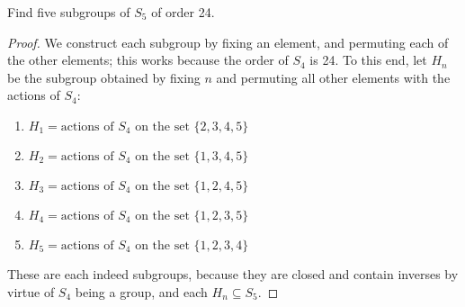 \documentclass{article}
\begin{document}
Find five subgroups of $S_5$ of order 24.

\begin{proof}
We construct each subgroup by fixing an element, and permuting each of the other elements; this works because the order of $S_4$ is 24. To this end, let $H_n$ be the subgroup obtained by fixing $n$ and permuting all other elements with the actions of $S_4$:
\begin{enumerate}
    \item $H_1 = \text{actions of $S_4$ on the set } \{2, 3, 4, 5\}$
    \item $H_2 = \text{actions of $S_4$ on the set } \{1, 3, 4, 5\}$
    \item $H_3 = \text{actions of $S_4$ on the set } \{1, 2, 4, 5\}$
    \item $H_4 = \text{actions of $S_4$ on the set } \{1, 2, 3, 5\}$
    \item $H_5 = \text{actions of $S_4$ on the set } \{1, 2, 3, 4\}$
\end{enumerate}
These are each indeed subgroups, because they are closed and contain inverses by virtue of $S_4$  being a group, and each $H_n \subseteq S_5$.

\end{proof}
\end{document}
